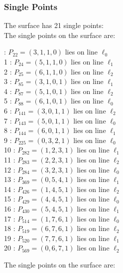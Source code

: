 \documentclass{article}
\begin{document}
{\subsubsection*{Single Points}
The surface has 21 single points:\\
The single points on the surface are:\\
\begin{multicols}{2}
 : $P_{22}=( 3, 1, 1, 0 )$ lies on line $\ell_{0}$\\
1 : $P_{24}=( 5, 1, 1, 0 )$ lies on line $\ell_{1}$\\
2 : $P_{25}=( 6, 1, 1, 0 )$ lies on line $\ell_{2}$\\
3 : $P_{85}=( 3, 1, 0, 1 )$ lies on line $\ell_{1}$\\
4 : $P_{87}=( 5, 1, 0, 1 )$ lies on line $\ell_{2}$\\
5 : $P_{88}=( 6, 1, 0, 1 )$ lies on line $\ell_{0}$\\
6 : $P_{141}=( 3, 0, 1, 1 )$ lies on line $\ell_{2}$\\
7 : $P_{143}=( 5, 0, 1, 1 )$ lies on line $\ell_{0}$\\
8 : $P_{144}=( 6, 0, 1, 1 )$ lies on line $\ell_{1}$\\
9 : $P_{225}=( 0, 3, 2, 1 )$ lies on line $\ell_{0}$\\
10 : $P_{282}=( 1, 2, 3, 1 )$ lies on line $\ell_{1}$\\
11 : $P_{283}=( 2, 2, 3, 1 )$ lies on line $\ell_{2}$\\
12 : $P_{284}=( 3, 2, 3, 1 )$ lies on line $\ell_{0}$\\
13 : $P_{369}=( 0, 5, 4, 1 )$ lies on line $\ell_{1}$\\
14 : $P_{426}=( 1, 4, 5, 1 )$ lies on line $\ell_{2}$\\
15 : $P_{429}=( 4, 4, 5, 1 )$ lies on line $\ell_{0}$\\
16 : $P_{430}=( 5, 4, 5, 1 )$ lies on line $\ell_{1}$\\
17 : $P_{514}=( 1, 7, 6, 1 )$ lies on line $\ell_{0}$\\
18 : $P_{519}=( 6, 7, 6, 1 )$ lies on line $\ell_{2}$\\
19 : $P_{520}=( 7, 7, 6, 1 )$ lies on line $\ell_{1}$\\
20 : $P_{569}=( 0, 6, 7, 1 )$ lies on line $\ell_{2}$\\
\end{multicols}
The single points on the surface are:\\
}
\end{document}
